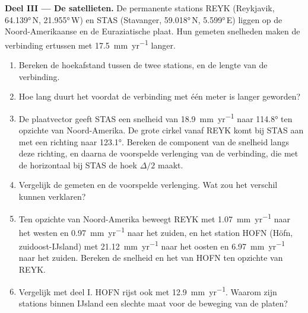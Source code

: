 \begin{problem}
\noindent\textbf{Deel III --- De satellieten.}
De permanente stations REYK (Reykjavik, \ang{64.139}\,N, \ang{21.955}\,W) en STAS (Stavanger, \ang{59.018}\,N, \ang{5.599}\,E) liggen op de Noord-Amerikaanse en de Euraziatische plaat. Hun gemeten snelheden maken de verbinding ertussen met \qty{17.5}{mm.yr^{-1}} langer.
\begin{enumerate}[resume]
  \item Bereken de hoekafstand tussen de twee stations, en de lengte van de verbinding.
  \item Hoe lang duurt het voordat de verbinding met één meter is langer geworden?
  \item De plaatvector geeft STAS een snelheid van \qty{18.9}{mm.yr^{-1}} naar \ang{114.8} ten opzichte van Noord-Amerika. De grote cirkel vanaf REYK komt bij STAS aan met een richting naar \ang{123.1}. Bereken de component van de snelheid langs deze richting, en daarna de voorspelde verlenging van de verbinding, die met de horizontaal bij STAS de hoek $\Delta/2$ maakt.
  \item Vergelijk de gemeten en de voorspelde verlenging. Wat zou het verschil kunnen verklaren?
  \item Ten opzichte van Noord-Amerika beweegt REYK met \qty{1.07}{mm.yr^{-1}} naar het westen en \qty{0.97}{mm.yr^{-1}} naar het zuiden, en het station HOFN (Höfn, zuidoost-IJsland) met \qty{21.12}{mm.yr^{-1}} naar het oosten en \qty{6.97}{mm.yr^{-1}} naar het zuiden. Bereken de snelheid en het  van HOFN ten opzichte van REYK.
  \item Vergelijk met deel I. HOFN rijst ook met \qty{12.9}{mm.yr^{-1}}. Waarom zijn stations binnen IJsland een slechte maat voor de beweging van de platen?
\end{enumerate}


\end{problem}
